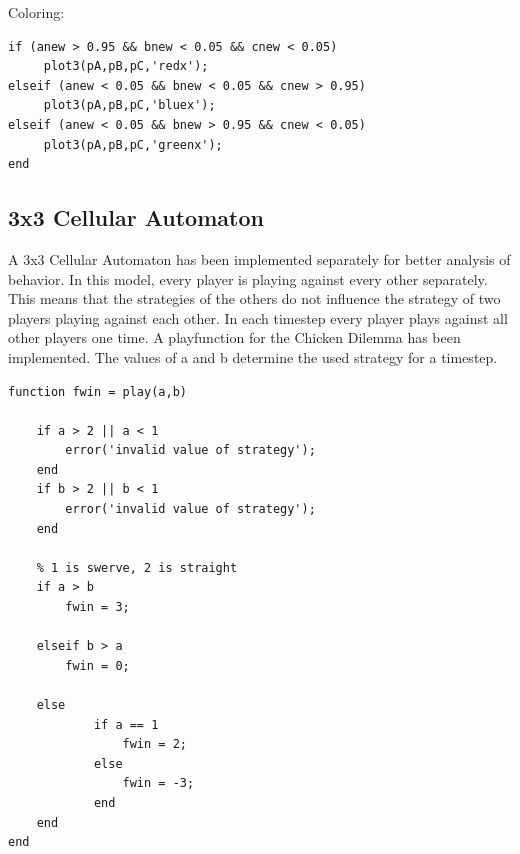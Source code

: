 \documentclass[11pt]{article}
\begin{document}
Coloring:
\begin{verbatim}
if (anew > 0.95 && bnew < 0.05 && cnew < 0.05) 
     plot3(pA,pB,pC,'redx');
elseif (anew < 0.05 && bnew < 0.05 && cnew > 0.95)
     plot3(pA,pB,pC,'bluex');
elseif (anew < 0.05 && bnew > 0.95 && cnew < 0.05)
     plot3(pA,pB,pC,'greenx');
end
\end{verbatim}

\subsection{3x3 Cellular Automaton}

A 3x3 Cellular Automaton has been implemented separately for better analysis of behavior. In this model, every player is playing against every other separately. This means that the strategies of the others do not influence the strategy of two players playing against each other. In each timestep every player plays against all other players one time. A playfunction for the Chicken Dilemma has been implemented. The values of a and b determine the used strategy for a timestep.
\begin{verbatim}
function fwin = play(a,b)
    
    if a > 2 || a < 1
        error('invalid value of strategy');
    end
    if b > 2 || b < 1
        error('invalid value of strategy');
    end
    
    % 1 is swerve, 2 is straight
    if a > b
        fwin = 3;
   
    elseif b > a
        fwin = 0;
        
    else 
            if a == 1
                fwin = 2;
            else 
                fwin = -3;
            end
    end
end
\end{verbatim}
\end{document}
